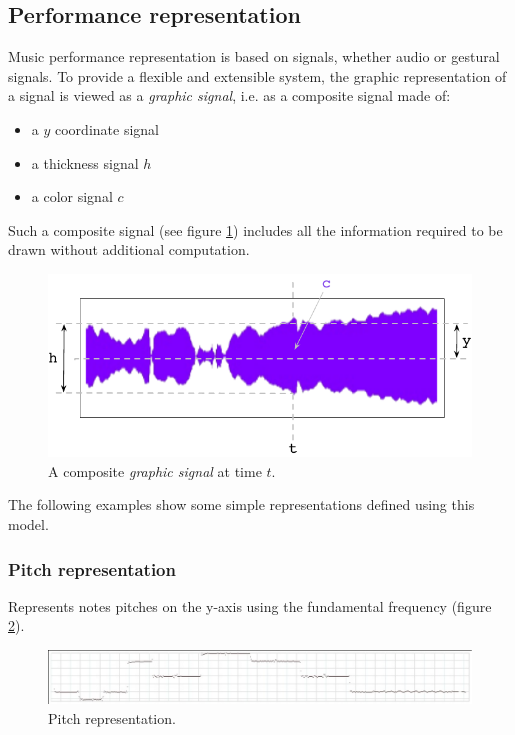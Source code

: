 \documentclass[11pt,letterpaper]{article}
\begin{document}
\subsection{Performance representation}
\label{perf}

Music performance representation is based on signals, whether audio or gestural signals. To provide a flexible and extensible system, the graphic representation of a signal is viewed as a \emph{graphic signal}, i.e. as a composite signal made of:
\begin{itemize}
\item a $y$ coordinate signal
\item a thickness signal $h$
\item a color signal $c$
\end{itemize}
Such a composite signal (see figure \ref{fig:sig}) includes all the information required to be drawn without additional computation.

\begin{figure}[h]
\begin{center}
	\includegraphics[width=0.98\columnwidth]{rsrc/graph}
\caption{A composite \emph{graphic signal} at time $t$.}
\label{fig:sig}
\end{center}
\end{figure}

The following examples show some simple representations defined using this model.
 
\subsubsection{Pitch representation}
Represents notes pitches on the y-axis using the fundamental frequency (figure \ref{fig:pitch}).
\begin{figure}[htbp]
\centerline{
	\includegraphics[width=0.99\columnwidth]{rsrc/curves/pitch}}
\caption{Pitch representation.}
\label{fig:pitch}
\end{figure}
\end{document}
